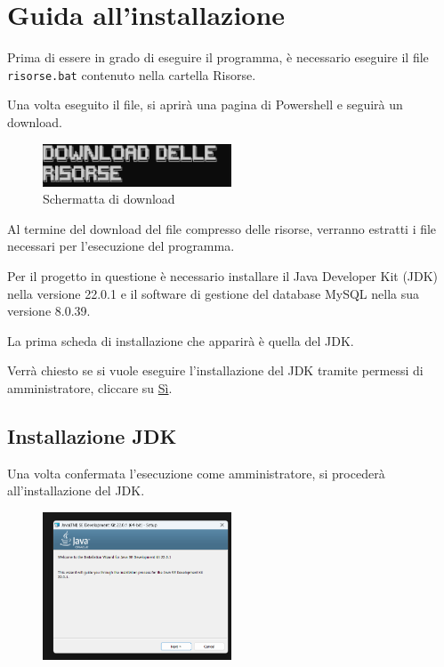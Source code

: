 \section{Guida all'installazione}

Prima di essere in grado di eseguire il programma, è necessario eseguire il file \texttt{risorse.bat} contenuto nella cartella Risorse. 


Una volta eseguito il file, si aprirà una pagina di Powershell e seguirà un download.

\begin{figure}[h!]
    \centering
    \includegraphics[width= 0.5\textwidth]{images/nuova docs.png}
    \caption{Schermatta di download}
\end{figure}

Al termine del download del file compresso delle risorse, verranno estratti i file necessari per l'esecuzione del programma.



Per il progetto in questione è necessario installare il Java Developer Kit (JDK) nella versione 22.0.1 e il software di gestione del database MySQL nella sua versione 8.0.39. 

La prima scheda di installazione che apparirà è quella del JDK. 

Verrà chiesto se si vuole eseguire l'installazione del JDK tramite permessi di amministratore, cliccare su \underline{Sì}.

\subsection{Installazione JDK}

Una volta confermata l'esecuzione come amministratore, si procederà all'installazione del JDK.

\begin{figure}[h!]
    \centering
    \includegraphics[width= 0.5\textwidth]{images/installazione java.png}
\end{figure}

